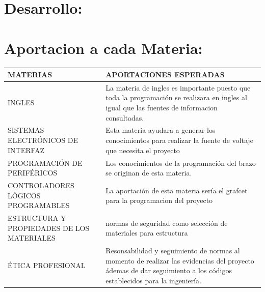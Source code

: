 \documentclass[14pt,a4paper]{article}
\begin{document}
\newpage

\section{Desarrollo:}

\section{Aportacion a cada Materia:}

\begin{tabular}{|p{70mm}|p{70mm}|} 

\hline
	MATERIAS & APORTACIONES ESPERADAS\\
\hline
	INGLES & La materia de ingles es importante puesto que toda la programación se realizara en ingles al igual que las fuentes de informacion consultadas.\\
\hline
	SISTEMAS ELECTRÓNICOS DE INTERFAZ & Esta materia ayudara a generar los conocimientos para realizar la fuente de voltaje que necesita el proyecto\\
\hline
	PROGRAMACIÓN DE PERIFÉRICOS & Los conocimientos de la programación del brazo se originan de esta materia.\\
\hline
	CONTROLADORES LÓGICOS PROGRAMABLES & La aportación de esta materia sería el grafcet para la  programacion del proyecto\\
\hline
	ESTRUCTURA Y PROPIEDADES DE LOS MATERIALES & normas de seguridad como selección de materiales para estructura\\
\hline
	ÉTICA PROFESIONAL & Resonsabilidad y seguimiento de normas al momento de realizar las evidencias del proyecto ádemas  de dar seguimiento a los códigos establecidos para la ingeniería.\\
\hline
\end{tabular}\\\\
\end{document}
